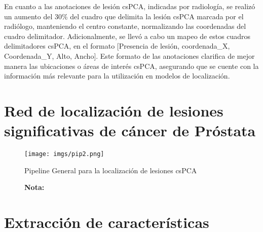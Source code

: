 En cuanto a las anotaciones de lesión csPCA, indicadas por radiología, se realizó un aumento del 30\% del cuadro que delimita la lesión csPCA marcada por el radiólogo, manteniendo el centro constante, normalizando las coordenadas del cuadro delimitador. Adicionalmente, se llevó a cabo un mapeo de estos cuadros delimitadores csPCA, en el formato [Presencia de lesión, coordenada\_X, Coordenada\_Y, Alto,  Ancho]. Este formato de las anotaciones clarifica de mejor manera las ubicaciones o áreas de interés csPCA, asegurando que se cuente con la información más relevante para la utilización en modelos de localización. 


\section{Red de localización de lesiones significativas de cáncer de Próstata}



\begin{figure}[h!]
	\centering
	\caption{Pipeline General para la localización de lesiones csPCA}
	\texttt{[image: imgs/pip2.png]}
	\label{fig:axADC}
\end{figure}

\begin{figure}[h!]
	\noindent \textbf{Nota:} 
\end{figure}


\section{Extracción de características}





